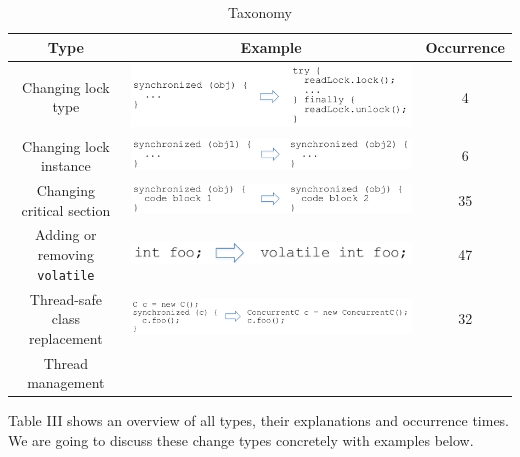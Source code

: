 \begin{table}
	\centering
	\caption{Taxonomy}
	\begin{tabular}{|c|c|c|}\hline
		Type&Example&Occurrence\\\hline
		Changing lock type&\includegraphics[scale=0.35]{pattern1}&4\\\hline
		Changing lock instance&\includegraphics[scale=0.35]{pattern2}&6\\\hline
		Changing critical section&\includegraphics[scale=0.35]{pattern3}&35\\\hline
		Adding or removing \texttt{volatile}&\includegraphics[scale=0.35]{pattern4}&47\\\hline
		Thread-safe class replacement&\includegraphics[scale=0.35]{pattern5}&32\\\hline
		Thread management&&\\\hline
	\end{tabular}
\end{table}


Table III shows an overview of all types, their explanations and occurrence times. We are going to discuss these change types concretely with examples below.

